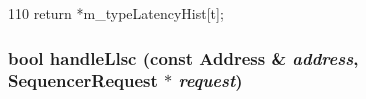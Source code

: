 \begin{DoxyCode}
110     { return *m_typeLatencyHist[t]; }
\end{DoxyCode}
\hypertarget{classSequencer_add40b4adaa2c154a2c81fcebc9ff4aaf}{
\subsubsection[{handleLlsc}]{\setlength{\rightskip}{0pt plus 5cm}bool handleLlsc (const {\bf Address} \& {\em address}, \/  {\bf SequencerRequest} $\ast$ {\em request})}}
\label{classSequencer_add40b4adaa2c154a2c81fcebc9ff4aaf}



